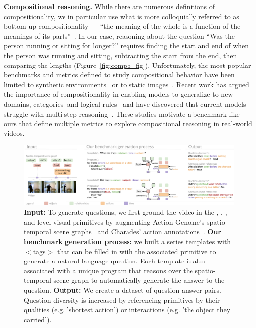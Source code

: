 \noindent\textbf{Compositional reasoning.}
While there are numerous definitions of compositionality, we in particular use what is more colloquially referred to as bottom-up compositionality --- ``the meaning of the whole is a function of the meanings of its parts''~\cite{cresswell1973logics}. In our case, reasoning about the question ``Was the person running or sitting for longer?'' requires finding the start and end of when the person was running and sitting, subtracting the start from the end, then comparing the lengths (Figure~\ref{fig:compo_fig}). Unfortunately, the most popular benchmarks and metrics defined to study compositional behavior have been limited to synthetic environments~\cite{keysers2019measuring,lake2018generalization,johnson2017clevr,yi2019clevrer} or to static images~\cite{hudson2019gqa}. Recent work has argued the importance of compositionality in enabling models to generalize to new domains, categories, and logical rules~\cite{lake2018generalization,vatashsky2020vqa} and have discovered that current models struggle with multi-step reasoning~\cite{fan2019heterogeneous}. These studies motivate a benchmark like ours that define multiple metrics to explore compositional reasoning in real-world videos.




\begin{figure}[t]
    \centering
    \includegraphics[width=0.95\linewidth]{figures/system.pdf}
    \caption{\textbf{Input:} To generate questions, we first ground the video in the , , , and  level visual primitives by augmenting Action Genome's spatio-temporal scene graphs~\cite{ji2020action} and Charades' action annotations~\cite{sigurdsson2016hollywood}. \textbf{Our benchmark generation process:} we built a series templates with $<$tags$>$ that can be filled in with the associated primitive to generate a natural language question. Each template is also associated with a unique program that reasons over the spatio-temporal scene graph to automatically generate the answer to the question. \textbf{Output: } We create a dataset of question-answer pairs. Question diversity is increased by referencing primitives by their qualities (e.g. 'shortest action') or interactions (e.g. 'the object they carried').}
    \label{fig:system}
\end{figure}
